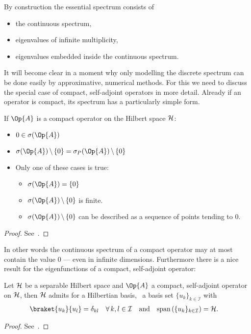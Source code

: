 \noindent
By construction the essential spectrum consists of
\begin{itemize}
	\item the continuous spectrum,
	\item eigenvalues of infinite multiplicity,
	\item eigenvalues embedded inside the continuous spectrum.
\end{itemize}
It will become clear in a moment
why only modelling the discrete spectrum can be done easily by
approximative, numerical methods.
For this we need to discuss the special case of
compact, self-adjoint operators in more detail.
Already if an operator is compact,
its spectrum has a particularly simple form.
\begin{prop}
	\label{prop:CompactSpectrum}
	If $\Op{A}$ is a compact operator on the Hilbert space $\mathcal{H}$:
	\begin{itemize}
		\item $0 \in \sigma(\Op{A})$
		\item $\sigma(\Op{A}) \, \backslash \, \{0\}
			= \sigma_P(\Op{A}) \, \backslash \, \{0\}$
		\item Only one of these cases is true:
			\begin{itemize}
				\item[\textopenbullet] $\sigma(\Op{A}) = \{0\}$
				\item[\textopenbullet] $\sigma(\Op{A}) \, \backslash \, \{0\}$ is finite.
				\item[\textopenbullet]
					$\sigma(\Op{A}) \, \backslash \, \{0\}$ can be described
					as a sequence of points tending to $0$.
			\end{itemize}
	\end{itemize}
	\begin{proof}
		See~\cite[p.~56]{Helffer2013}.
	\end{proof}
\end{prop}
In other words the continuous spectrum of a compact operator
may at most contain the value $0$ --- even in infinite dimensions.
Furthermore there is a nice result for the eigenfunctions of a compact, self-adjoint
operator:
\begin{prop}
	\label{prop:CompactBasis}
	Let $\mathcal{H}$ be a separable Hilbert space and $\Op{A}$ a compact,
	self-adjoint operator on $\mathcal{H}$,
	then $\mathcal{H}$ admits for a Hilbertian basis,
	\ie~a basis set $\{ u_k \}_{k \in \mathcal{I}}$ with
	\begin{align*}
	\braket{u_k}{u_l} &= \delta_{kl} \quad \forall \, k,l \in \mathcal{I}
	&&\text{and}&
	\spacespan \left( \{ u_k \}_{k \in \mathcal{I}} \right) &= \hilbert.
	\end{align*}
	\begin{proof}
		See~\cite[p.~60]{Helffer2013}.
	\end{proof}
\end{prop}

